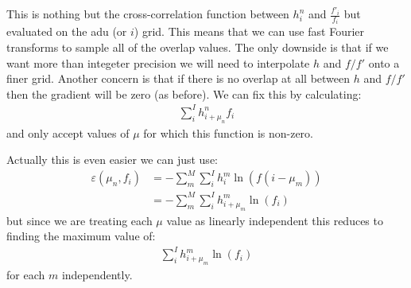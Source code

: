 \documentclass[11pt]{article}
\begin{document}
This is nothing but the cross-correlation function between $h^n_{i}$ and $\frac{f'_i}{f_i}$ but evaluated on the adu (or $i$) grid. This means that we can use fast Fourier transforms to sample all of the overlap values. The only downside is that if we want more than integeter precision we will need to interpolate $h$ and $f/f'$ onto a finer grid. Another concern is that if there is no overlap at all between $h$ and $f/f'$ then the gradient will be zero (as before). We can fix this by calculating:
\begin{align}
   \sum_i^I h^n_{i+\mu_n} f_i
\end{align}
and only accept values of $\mu$ for which this function is non-zero.

Actually this is even easier we can just use:
\begin{align}
   \varepsilon(\mu_n, f_i) &= -\sum_m^M \sum_i^I h^m_i \ln(f(i - \mu_m))\\
                           &= -\sum_m^M \sum_i^I h^m_{i + \mu_m} \ln(f_i)
\end{align}
but since we are treating each $\mu$ value as linearly independent this reduces to finding the maximum value of:
\begin{align}
    \sum_i^I h^m_{i + \mu_m} \ln(f_i)
\end{align}
for each $m$ independently. 
\end{document}
